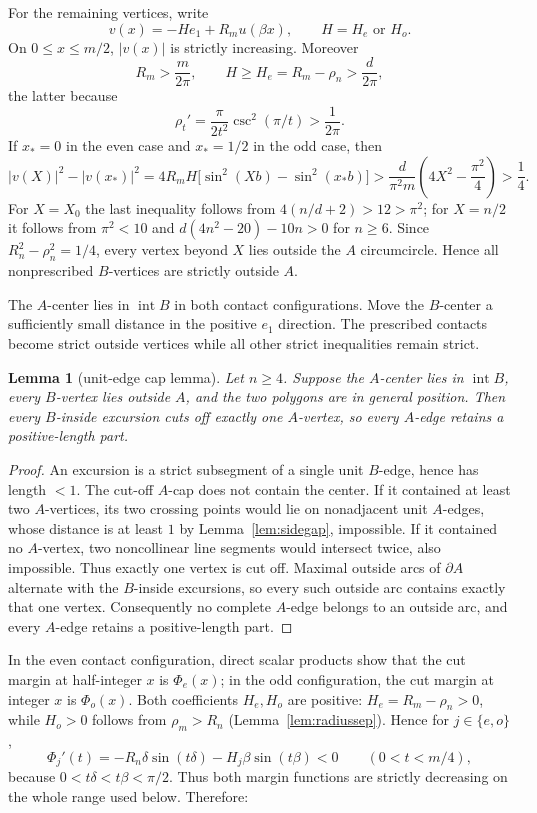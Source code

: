 \documentclass[11pt]{article}
\newtheorem{lemma}[theorem]{Lemma}
\theoremstyle{remark}
\begin{document}
For the remaining vertices, write
\[
v(x)=-H e_1+R_m u(\beta x),\qquad H=H_e\text{ or }H_o.
\]
On $0\le x\le m/2$, $|v(x)|$ is strictly increasing. Moreover
\[
R_m>\frac{m}{2\pi},\qquad
H\ge H_e=R_m-\rho_n>\frac{d}{2\pi},
\]
the latter because
\[
\rho_t'=\frac{\pi}{2t^2}\csc^2(\pi/t)>\frac1{2\pi}.
\] If $x_*=0$ in the even case and $x_*=1/2$ in the odd case, then
\[
|v(X)|^2-|v(x_*)|^2
=4R_mH\bigl[\sin^2(Xb)-\sin^2(x_*b)\bigr]
>\frac{d}{\pi^2m}\left(4X^2-\frac{\pi^2}{4}\right)>\frac14.
\tag{6.4}
\]
For $X=X_0$ the last inequality follows from $4(n/d+2)>12>\pi^2$; for $X=n/2$ it follows from $\pi^2<10$ and $d(4n^2-20)-10n>0$ for $n\ge6$. Since $R_n^2-\rho_n^2=1/4$, every vertex beyond $X$ lies outside the $A$ circumcircle. Hence all nonprescribed $B$-vertices are strictly outside $A$.

The $A$-center lies in $\operatorname{int}B$ in both contact configurations. Move the $B$-center a sufficiently small distance in the positive $e_1$ direction. The prescribed contacts become strict outside vertices while all other strict inequalities remain strict.

\begin{lemma}[unit-edge cap lemma]\label{lem:unitcap}
Let $n\ge4$. Suppose the $A$-center lies in $\operatorname{int}B$, every $B$-vertex lies outside $A$, and the two polygons are in general position. Then every $B$-inside excursion cuts off exactly one $A$-vertex, so every $A$-edge retains a positive-length part.
\end{lemma}

\begin{proof}
An excursion is a strict subsegment of a single unit $B$-edge, hence has length $<1$. The cut-off $A$-cap does not contain the center. If it contained at least two $A$-vertices, its two crossing points would lie on nonadjacent unit $A$-edges, whose distance is at least $1$ by Lemma~\ref{lem:sidegap}, impossible. If it contained no $A$-vertex, two noncollinear line segments would intersect twice, also impossible. Thus exactly one vertex is cut off. Maximal outside arcs of $\partial A$ alternate with the $B$-inside excursions, so every such outside arc contains exactly that one vertex. Consequently no complete $A$-edge belongs to an outside arc, and every $A$-edge retains a positive-length part.
\end{proof}

In the even contact configuration, direct scalar products show that the cut margin at half-integer $x$ is $\Phi_e(x)$; in the odd configuration, the cut margin at integer $x$ is $\Phi_o(x)$.  Both coefficients $H_e,H_o$ are positive: $H_e=R_m-\rho_n>0$, while $H_o>0$ follows from $\rho_m>R_n$ (Lemma~\ref{lem:radiussep}).  Hence for $j\in\{e,o\}$,
\[
\Phi_j'(t)=-R_n\delta\sin(t\delta)-H_j\beta\sin(t\beta)<0
\qquad(0<t<m/4),
\]
because $0<t\delta<t\beta<\pi/2$.  Thus both margin functions are strictly decreasing on the whole range used below. Therefore:
\end{document}
